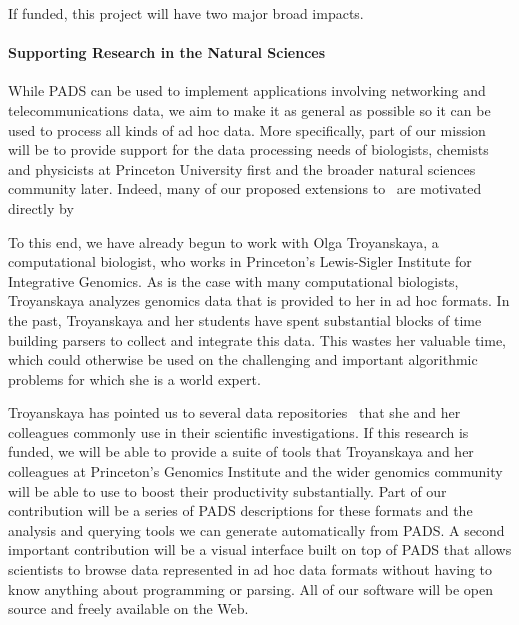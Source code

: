 \documentclass[11pt]{article}
\begin{document}
If funded, this project will have two major broad impacts.

\paragraph*{Supporting Research in the Natural Sciences}
While PADS can be used to implement applications involving
networking and telecommunications data,  we aim to make it
as general as possible so it can be used to process all
kinds of ad hoc data.  More specifically, part of our mission will be
to provide support for the data processing needs of biologists,
chemists and physicists at Princeton University first and 
the broader natural sciences community later.  Indeed, many of our
proposed extensions to \pads{}\ are motivated directly by
 
To this end, we have already begun to work with Olga Troyanskaya, a
computational biologist, who works in Princeton's Lewis-Sigler Institute 
for Integrative Genomics.  
As is the case with many computational biologists,
Troyanskaya analyzes genomics data that is provided to her in ad hoc
formats.  In the past, Troyanskaya and her students have spent
substantial blocks of time building parsers to collect and integrate
this data.  This wastes her valuable time, which could otherwise be
used on the challenging and important algorithmic problems for which
she is a world expert.

Troyanskaya has pointed us to several data
repositories~\cite{grid,bind,geneontology} that she and her colleagues
commonly use in their scientific investigations.  If this research is
funded, we will be able to provide a suite of tools that Troyanskaya
and her colleagues at Princeton's Genomics Institute and the wider
genomics community will be able to use to boost their productivity
substantially.  Part of our contribution will be a series of PADS
descriptions for these formats and the analysis and querying tools we
can generate automatically from PADS.  A second important contribution
will be a visual interface built on top of PADS that allows scientists
to browse data represented in ad hoc data formats without having to
know anything about programming or parsing.  All of our software will
be open source and freely available on the Web.
\end{document}
